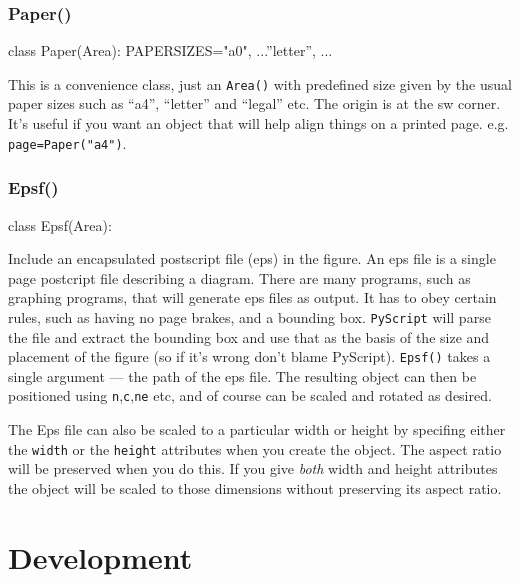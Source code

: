 \documentclass[a4paper]{book}
\begin{document}

\subsection{Paper()}
\label{sec:paper}
\begin{python}
class Paper(Area):
    PAPERSIZES={"a0", ...''letter'', ...}
\end{python}

This is a convenience class, just an \Verb|Area()| with predefined
size given by the usual paper sizes such as ``a4'', ``letter'' and
``legal'' etc. The origin is at the sw corner. It's useful if you want
an object that will help align things on a printed page. e.g.
\Verb|page=Paper("a4")|.


\subsection{Epsf()}
\label{sec:epsf}
\begin{python}
class Epsf(Area):
\end{python}

Include an encapsulated postscript file (eps) in the figure. An eps
file is a single page postcript file describing a diagram. There are
many programs, such as graphing programs, that will generate eps files
as output.  It has to obey certain rules, such as having no page
brakes, and a bounding box.  \Verb|PyScript| will parse the file and
extract the bounding box and use that as the basis of the size and
placement of the figure (so if it's wrong don't blame PyScript).
\Verb|Epsf()| takes a single argument --- the path of the eps file.
The resulting object can then be positioned using \Verb|n|,\Verb|c|,\Verb|ne|
etc, and of course can be scaled and rotated as desired.

The Eps file can also be scaled to a particular width or height by
specifing either the \Verb|width| or the \Verb|height| attributes when
you create the object. The aspect ratio will be preserved when you do
this.  If you give \emph{both} width and height attributes the object
will be scaled to those dimensions without preserving its aspect
ratio.

\chapter{Development}
\end{document}
